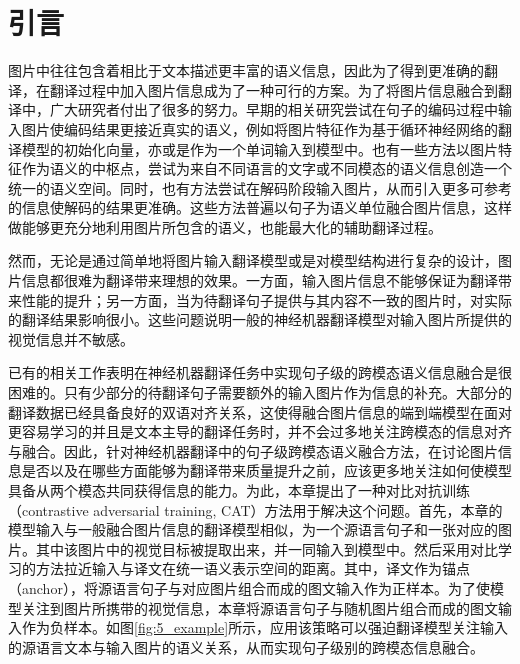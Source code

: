 \section{引言}
图片中往往包含着相比于文本描述更丰富的语义信息，因此为了得到更准确的翻译，在翻译过程中加入图片信息成为了一种可行的方案。为了将图片信息融合到翻译中，广大研究者付出了很多的努力。早期的相关研究尝试在句子的编码过程中输入图片使编码结果更接近真实的语义，例如将图片特征作为基于循环神经网络的翻译模型的初始化向量，亦或是作为一个单词输入到模型中。也有一些方法以图片特征作为语义的中枢点，尝试为来自不同语言的文字或不同模态的语义信息创造一个统一的语义空间。同时，也有方法尝试在解码阶段输入图片，从而引入更多可参考的信息使解码的结果更准确。这些方法普遍以句子为语义单位融合图片信息，这样做能够更充分地利用图片所包含的语义，也能最大化的辅助翻译过程。

然而，无论是通过简单地将图片输入翻译模型或是对模型结构进行复杂的设计，图片信息都很难为翻译带来理想的效果。一方面，输入图片信息不能够保证为翻译带来性能的提升；另一方面，当为待翻译句子提供与其内容不一致的图片时，对实际的翻译结果影响很小。这些问题说明一般的神经机器翻译模型对输入图片所提供的视觉信息并不敏感。


已有的相关工作表明在神经机器翻译任务中实现句子级的跨模态语义信息融合是很困难的。只有少部分的待翻译句子需要额外的输入图片作为信息的补充。大部分的翻译数据已经具备良好的双语对齐关系，这使得融合图片信息的端到端模型在面对更容易学习的并且是文本主导的翻译任务时，并不会过多地关注跨模态的信息对齐与融合。因此，针对神经机器翻译中的句子级跨模态语义融合方法，在讨论图片信息是否以及在哪些方面能够为翻译带来质量提升之前，应该更多地关注如何使模型具备从两个模态共同获得信息的能力。为此，本章提出了一种对比对抗训练（contrastive adversarial training, CAT）方法用于解决这个问题。首先，本章的模型输入与一般融合图片信息的翻译模型相似，为一个源语言句子和一张对应的图片。其中该图片中的视觉目标被提取出来，并一同输入到模型中。然后采用对比学习的方法拉近输入与译文在统一语义表示空间的距离。其中，译文作为锚点（anchor），将源语言句子与对应图片组合而成的图文输入作为正样本。为了使模型关注到图片所携带的视觉信息，本章将源语言句子与随机图片组合而成的图文输入作为负样本。如图\ref{fig:5_example}所示，应用该策略可以强迫翻译模型关注输入的源语言文本与输入图片的语义关系，从而实现句子级别的跨模态信息融合。

